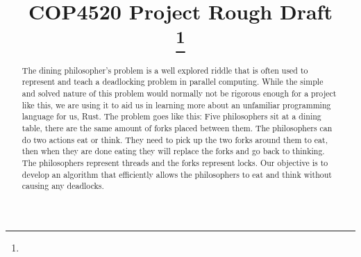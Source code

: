 \documentclass[conference]{IEEEtran}
\begin{document}
	
	\title{COP4520 Project Rough Draft\\
		{}
		\thanks{}
	}
	
	\author{
		
		\and
		\and
		\and
	}
	
	\maketitle
	
	\begin{abstract}
		The dining philosopher’s problem is a well explored riddle that is often used to represent and teach a deadlocking problem in parallel computing. While the simple and solved nature of this problem would normally not be rigorous enough for a project like this, we are using it to aid us in learning more about an unfamiliar programming language for us, Rust. The problem goes like this: Five philosophers sit at a dining table, there are the same amount of forks placed between them. The philosophers can do two actions eat or think. They need to pick up the two forks around them to eat, then when they are done eating they will replace the forks and go back to thinking. The philosophers represent threads and the forks represent locks. Our objective is to develop an algorithm that efficiently allows the philosophers to eat and think without causing any deadlocks.
	\end{abstract}
	
	
\end{document}
